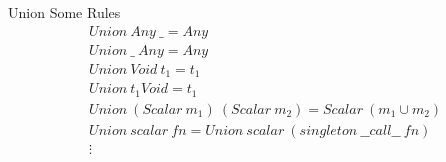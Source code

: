 \documentclass[12pt,t]{beamer}
\newcommand{\subt}[1]{{\footnotesize \color{subtitle} {#1}}}
\begin{document}
\begin{frame}{Union}
    \subt{Some Rules}
    \[
      \begin{array}{ll}
          & Union\ Any\ \_ = Any \\
          & Union\ \_\ Any = Any \\
          & Union\ Void\ t_1 = t_1 \\
          & Union\ t_1 Void = t_1 \\
          & Union\ (Scalar\ m_1)\ (Scalar\ m_2) = Scalar\ (m_1\cup m_2) \\
          & Union\ scalar\ fn = Union\ scalar\ (singleton\ \_\_call\_\_\ fn) \\
          & \vdots
    \end{array}
    \]
\end{frame}
\end{document}
